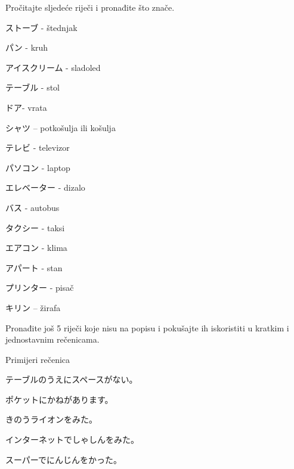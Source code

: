 
\author{Katja Kržišnik}

	
	\begin{mondai}{Pročitajte sljedeće riječi i pronađite što znače.}
		\item ストーブ  - štednjak
		\item パン - kruh
		\item アイスクリーム - sladoled
		\item テーブル - stol
		\item ドア- vrata
		\item シャツ – potkošulja ili košulja
		\item テレビ - televizor
		\item パソコン - laptop
		\item エレベーター - dizalo
		\item バス - autobus
		\item タクシー - taksi
		\item エアコン - klima
		\item アパート - stan
		\item プリンター - pisač
		\item キリン – žirafa
		
	\end{mondai}
	
	Pronađite još 5 riječi koje nisu na popisu i pokušajte ih iskoristiti u kratkim i jednostavnim rečenicama.
	
	\begin{mondai}{Primijeri rečenica}
		\item テーブルのうえにスペースがない。
		\item ポケットにかねがあります。
		\item きのうライオンをみた。
		\item インターネットでしゃしんをみた。
		\item スーパーでにんじんをかった。
	\end{mondai}
		

